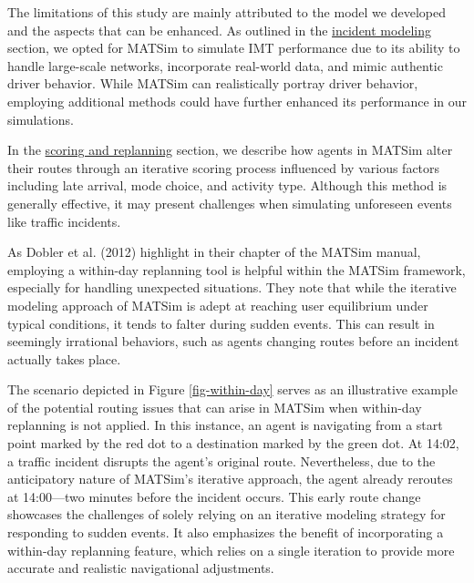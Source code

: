 \documentclass[fancy, oneside, mastersfancy, ms]{byuthesis}
\begin{document}
The limitations of this study are mainly attributed to the model we
developed and the aspects that can be enhanced. As outlined in the
\protect\hyperlink{sec-inc_modeling}{incident modeling} section, we
opted for MATSim to simulate IMT performance due to its ability to
handle large-scale networks, incorporate real-world data, and mimic
authentic driver behavior. While MATSim can realistically portray driver
behavior, employing additional methods could have further enhanced its
performance in our simulations.

In the \protect\hyperlink{sec-MATSim_Score}{scoring and replanning}
section, we describe how agents in MATSim alter their routes through an
iterative scoring process influenced by various factors including late
arrival, mode choice, and activity type. Although this method is
generally effective, it may present challenges when simulating
unforeseen events like traffic incidents.

As Dobler et al. (2012) highlight in their chapter of the MATSim manual,
employing a within-day replanning tool is helpful within the MATSim
framework, especially for handling unexpected situations. They note that
while the iterative modeling approach of MATSim is adept at reaching
user equilibrium under typical conditions, it tends to falter during
sudden events. This can result in seemingly irrational behaviors, such
as agents changing routes before an incident actually takes place.

The scenario depicted in Figure \ref{fig-within-day} serves as an
illustrative example of the potential routing issues that can arise in
MATSim when within-day replanning is not applied. In this instance, an
agent is navigating from a start point marked by the red dot to a
destination marked by the green dot. At 14:02, a traffic incident
disrupts the agent's original route. Nevertheless, due to the
anticipatory nature of MATSim's iterative approach, the agent already
reroutes at 14:00---two minutes before the incident occurs. This early
route change showcases the challenges of solely relying on an iterative
modeling strategy for responding to sudden events. It also emphasizes
the benefit of incorporating a within-day replanning feature, which
relies on a single iteration to provide more accurate and realistic
navigational adjustments.
\end{document}
